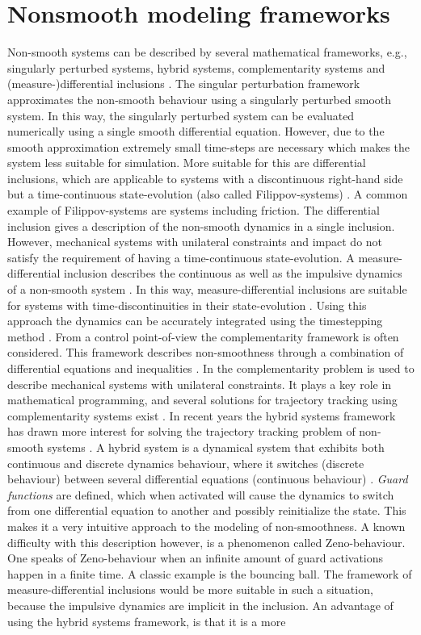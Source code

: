 \documentclass[../DC2017114Bouma.tex]{subfiles}
\begin{document}
\section{Nonsmooth modeling frameworks}
Non-smooth systems can be described by several mathematical frameworks, e.g., singularly perturbed systems, hybrid systems, complementarity systems and (measure-)differential inclusions \cite{Leine2004}. The singular perturbation framework approximates the non-smooth behaviour using a singularly perturbed smooth system. In this way, the singularly perturbed system can be evaluated numerically using a single smooth differential equation. However, due to the smooth approximation extremely small time-steps are necessary which makes the system less suitable for simulation. More suitable for this are differential inclusions, which are applicable to systems with a discontinuous right-hand side but a time-continuous state-evolution (also called Filippov-systems) \cite{Filippov1988}. A common example of Filippov-systems are systems including friction. The differential inclusion gives a description of the non-smooth dynamics in a single inclusion. However, mechanical systems with unilateral constraints and impact do not satisfy the requirement of having a time-continuous state-evolution. A measure-differential inclusion describes the continuous as well as the impulsive dynamics of a non-smooth system \cite{Leine2008b}. In this way, measure-differential inclusions are suitable for systems with time-discontinuities in their state-evolution \cite{Moreau1988,Brogliato1999}. Using this approach the dynamics can be accurately integrated using the timestepping method \cite{Wouwa}. From a control point-of-view the complementarity framework is often considered. This framework describes non-smoothness through a combination of differential equations and inequalities \cite{VanDerSchaft1998,Heemels1999}. In \cite{Glocker2001} the complementarity problem is used to describe mechanical systems with unilateral constraints. It plays a key role in mathematical programming, and several solutions for trajectory tracking using complementarity systems exist \cite{Bourgeot2005,Morarescu2010}. In recent years the hybrid systems framework has drawn more interest for solving the trajectory tracking problem of non-smooth systems \cite{Hyun2014,Morris2009}. A hybrid system is a dynamical system that exhibits both continuous and discrete dynamics behaviour, where it switches (discrete behaviour) between several differential equations (continuous behaviour) \cite{Goebel2009}. \textit{Guard functions} are defined, which when activated will cause the dynamics to switch from one differential equation to another and possibly reinitialize the state. This makes it a very intuitive approach to the modeling of non-smoothness. A known difficulty with this description however, is a phenomenon called Zeno-behaviour. One speaks of Zeno-behaviour when an infinite amount of guard activations happen in a finite time. A classic example is the bouncing ball. The framework of measure-differential inclusions would be more suitable in such a situation, because the impulsive dynamics are implicit in the inclusion. An advantage of using the hybrid systems framework, is that it is a more 
\end{document}
